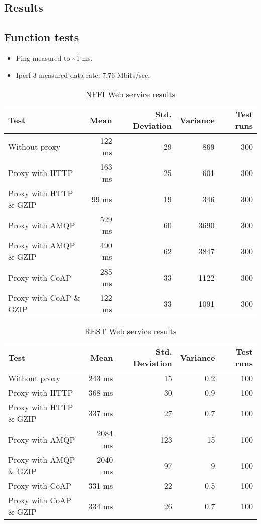 \documentclass[USenglish]{ifimaster}
\begin{document}
\begin{appendices}
\chapter{Results}

\section{Function tests}

\begin{itemize}
	\item Ping measured to \textasciitilde 1 ms.
	\item Iperf 3 measured data rate: 7.76 Mbits/sec.
\end{itemize}

\begin{table}[H]
\begin{tabular}{| l | r | r | r | r |}
\hline
  \textbf{Test} & \textbf{Mean} & \textbf{Std. Deviation} & \textbf{Variance} & \textbf{Test runs}\\ \hline
  Without proxy & 122 ms & 29 & 869 & 300 \\ \hline
  Proxy with HTTP & 163 ms & 25 & 601 & 300 \\ \hline
  Proxy with HTTP \& GZIP & 99 ms & 19 & 346 & 300 \\ \hline
  Proxy with AMQP & 529 ms & 60 & 3690 & 300 \\ \hline
  Proxy with AMQP \& GZIP & 490 ms & 62 & 3847 & 300\\ \hline
  Proxy with CoAP & 285 ms & 33 & 1122 & 300 \\ \hline
  Proxy with CoAP \& GZIP & 122 ms & 33 & 1091 & 300 \\ \hline
\end{tabular}
\caption{NFFI Web service results}
\end{table}


\begin{table}[H]
\begin{tabular}{| l | r | r | r | r |}
\hline
  \textbf{Test} & \textbf{Mean} & \textbf{Std. Deviation} & \textbf{Variance} & \textbf{Test runs}\\ \hline
  Without proxy & 243 ms & 15 & 0.2 & 100 \\ \hline
  Proxy with HTTP & 368 ms & 30 & 0.9 & 100 \\ \hline
  Proxy with HTTP \& GZIP & 337 ms & 27 & 0.7 & 100 \\ \hline
  Proxy with AMQP & 2084 ms & 123 & 15 & 100 \\ \hline
  Proxy with AMQP \& GZIP & 2040 ms & 97 & 9 & 100\\ \hline
  Proxy with CoAP & 331 ms & 22 & 0.5 & 100 \\ \hline
  Proxy with CoAP \& GZIP & 334 ms & 26 & 0.7 & 100 \\ \hline
\end{tabular}
\caption{REST Web service results}
\end{table}



\end{appendices}
\end{document}
